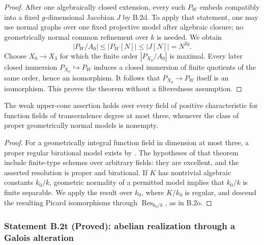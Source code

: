 \begin{proof}
After one algebraically closed extension, every such $P_W$
embeds compatibly into a fixed $g$-dimensional Jacobian $J$ by
B.2d.  To apply that statement, one may use normal graphs over
one fixed projective model after algebraic closure; no
geometrically normal common refinement over $k$ is needed.
We obtain
\[
       |P_W/A_0|\le |P_W[N]|\le |J[N]|=N^{2g}.
\]
Choose $X_0\to X_3$ for which the finite order $|P_{X_0}/A_0|$
is maximal.  Every later closed immersion
$P_{X_0}\hookrightarrow P_W$ induces a closed immersion of
finite quotients of the same order, hence an isomorphism.
It follows that $P_{X_0}\to P_W$ itself is an isomorphism.
This proves the theorem without a filteredness assumption.
\end{proof}

\begin{corollary}
The weak upper-cone assertion holds over every field of positive
characteristic for function fields of transcendence degree at most
three, whenever the class of proper geometrically normal models
is nonempty.
\end{corollary}
\begin{proof}
For a geometrically integral function field in dimension at most
three, a proper regular birational model exists by
\cite[Theorem 1.1, pp.~3--4 of the author manuscript]{CossartPiltant2019B}.
The hypotheses of that theorem include finite-type schemes over
arbitrary fields: they are excellent, and the asserted resolution
is proper and birational.
If $K$ has nontrivial algebraic constants $k_0/k$, geometric
normality of a permitted model implies that $k_0/k$ is finite
separable.  We apply the result over $k_0$, where $K/k_0$ is
regular, and descend the resulting Picard isomorphisms through
$\operatorname{Res}_{k_0/k}$, as in B.2o.
\end{proof}


\subsubsection*{Statement B.2t (Proved): abelian realization through a Galois alteration}

